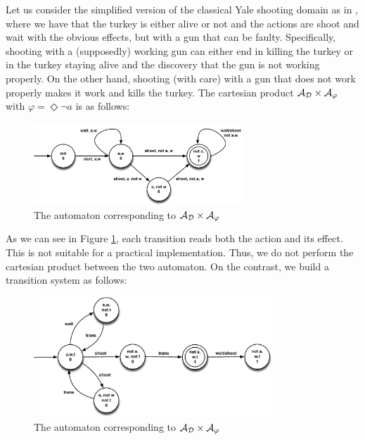 \begin{example}
Let us consider the simplified version of the classical Yale shooting domain \citep{hanks1986default} as in \cite{de2018automata}, where we have that the turkey is either alive or not and the actions are shoot and wait with the obvious effects, but with a gun that can be faulty. Specifically, shooting with a (supposedly) working gun can either end in killing the turkey or in the turkey staying alive and the discovery that the gun is not working properly. On the other hand, shooting (with care) with a gun that does not work properly makes it work and kills the turkey. The cartesian product $\mathcal{A}_{\mathcal{D}} \times \mathcal{A}_\varphi$ with $\varphi = \Diamond\lnot a$ is as follows:

\begin{figure}[h]
\centering
\includegraphics[width=0.7\textwidth]{images/cartesian-prod}
\caption{The \DFA automaton corresponding to $\mathcal{A}_{\mathcal{D}} \times \mathcal{A}_\varphi$} 
\label{fig:dfa-game}
\end{figure}

\noindent As we can see in Figure \ref{fig:dfa-game}, each transition reads both the action and its effect. This is not suitable for a practical implementation. Thus, we do not perform the cartesian product between the two automaton. On the contrast, we build a transition system as follows:

\begin{figure}[h]
\centering
\includegraphics[width=0.8\textwidth]{images/yale-our-sol}
\caption{The \DFA automaton corresponding to $\mathcal{A}_{\mathcal{D}} \times \mathcal{A}_\varphi$} 
\label{fig:yale-our-sol}
\end{figure}

\end{example}

